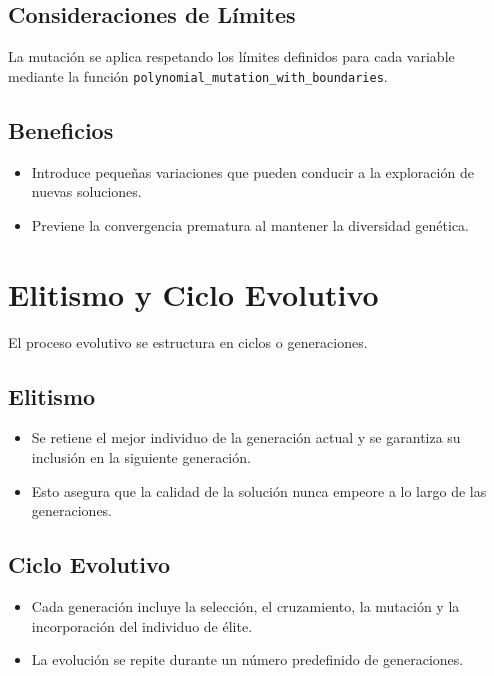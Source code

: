 \subsection*{Consideraciones de L\'imites}
La mutaci\'on se aplica respetando los l\'imites definidos para cada variable mediante la funci\'on \texttt{polynomial\_mutation\_with\_boundaries}.

\subsection*{Beneficios}
\begin{itemize}
    \item Introduce peque\~nas variaciones que pueden conducir a la exploraci\'on de nuevas soluciones.
    \item Previene la convergencia prematura al mantener la diversidad gen\'etica.
\end{itemize}

\section{Elitismo y Ciclo Evolutivo}

El proceso evolutivo se estructura en ciclos o generaciones.

\subsection*{Elitismo}
\begin{itemize}
    \item Se retiene el mejor individuo de la generaci\'on actual y se garantiza su inclusi\'on en la siguiente generaci\'on.
    \item Esto asegura que la calidad de la soluci\'on nunca empeore a lo largo de las generaciones.
\end{itemize}

\subsection*{Ciclo Evolutivo}
\begin{itemize}
    \item Cada generaci\'on incluye la selecci\'on, el cruzamiento, la mutaci\'on y la incorporaci\'on del individuo de \'elite.
    \item La evoluci\'on se repite durante un n\'umero predefinido de generaciones.
\end{itemize}

